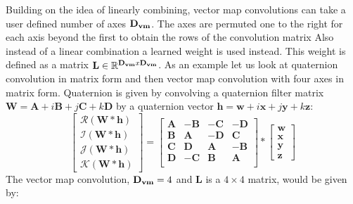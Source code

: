 \documentclass[14pt,a4paper]{article}
\begin{document}
Building on the idea of linearly combining, vector map convolutions can take a user defined number of axes $\bold{D_{vm}}$.
The axes are permuted one to the right for each axis beyond the first to obtain the rows of the convolution matrix
Also instead of a linear combination a learned weight is used instead.
This weight is defined as a matrix $\textbf{L} \in \mathbb{R}^{\bold{D_{vm}}x\bold{D_{vm}}}$.
As an example let us look at quaternion convolution in matrix form and then vector map convolution with four axes in matrix form.
Quaternion is given by convolving a quaternion filter matrix $\textbf{W}=\textbf{A}+\textit{i}\textbf{B}+\textit{j}\textbf{C}+\textit{k}\textbf{D}$ by a quaternion vector $\textbf{h}=\textbf{w}+\textit{i}\textbf{x}+\textit{j}\textbf{y}+\textit{k}\textbf{z}$:
\begin{equation}
\begin{bmatrix}
 \mathscr{R}(\textbf{W}\ast \textbf{h}) \\ 
 \mathscr{I}(\textbf{W}\ast \textbf{h}) \\
 \mathscr{J}(\textbf{W}\ast \textbf{h}) \\
 \mathscr{K}(\textbf{W}\ast \textbf{h}) 
\end{bmatrix}
=
\begin{bmatrix}
 \textbf{A} & -\textbf{B} & -\textbf{C} & -\textbf{D} \\
 \textbf{B} & \textbf{A} & -\textbf{D} & \textbf{C} \\
 \textbf{C} & \textbf{D} & \textbf{A} & -\textbf{B} \\
 \textbf{D} & -\textbf{C} & \textbf{B} & \textbf{A} \\
\end{bmatrix}
\ast
\begin{bmatrix}
 \textbf{w} \\ 
 \textbf{x} \\
 \textbf{y} \\
 \textbf{z}
\end{bmatrix}
\label{eq:quatconv}
\end{equation}
The vector map convolution, $\bold{D_{vm}} = 4$ and $\textbf{L}$ is a $4\times4$ matrix, would be given by:
\end{document}
